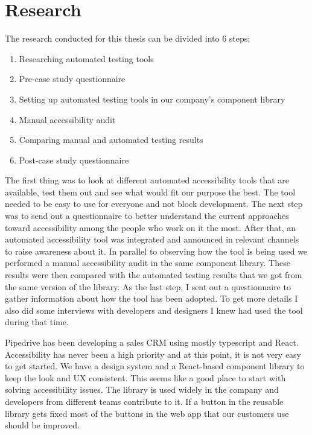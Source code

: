 \documentclass{master_thesis}
\begin{document}
\section{Research}

The research conducted for this thesis can be divided into 6 steps:

\begin{enumerate}
	\item Researching automated testing tools
	\item Pre-case study questionnaire
	\item Setting up automated testing tools in our company's component library
	\item Manual accessibility audit
	\item Comparing manual and automated testing results
	\item Post-case study questionnaire
\end{enumerate}

The first thing was to look at different automated accessibility tools that are available, test them out and see what would fit our purpose the best. The tool needed to be easy to use for everyone and not block development. The next step was to send out a questionnaire to better understand the current approaches toward accessibility among the people who work on it the most. After that, an automated accessibility tool was integrated and announced in relevant channels to raise awareness about it. In parallel to observing how the tool is being used we performed a manual accessibility audit in the same component library. These results were then compared with the automated testing results that we got from the same version of the library. As the last step, I sent out a questionnaire to gather information about how the tool has been adopted. To get more details I also did some interviews with developers and designers I knew had used the tool during that time.

Pipedrive has been developing a sales CRM using mostly typescript and React. Accessibility has never been a high priority and at this point, it is not very easy to get started. We have a design system and a React-based component library to keep the look and UX consistent. This seems like a good place to start with solving accessibility issues. The library is used widely in the company and developers from different teams contribute to it. If a button in the reusable library gets fixed most of the buttons in the web app that our customers use should be improved.
\end{document}
